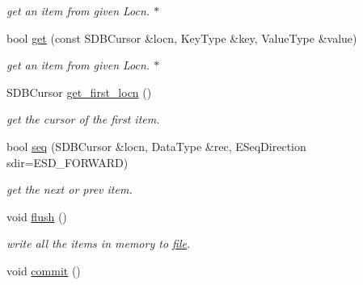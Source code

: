 \begin{CompactItemize}
\begin{CompactList}\small\item\em get an item from given Locn. $\ast$ \item\end{CompactList}\item 
\hypertarget{classsdb__btree_4e4408d7daafd2fcf1a1baeff8101765}{
bool \hyperlink{classsdb__btree_4e4408d7daafd2fcf1a1baeff8101765}{get} (const SDBCursor \&locn, KeyType \&key, ValueType \&value)}
\label{classsdb__btree_4e4408d7daafd2fcf1a1baeff8101765}

\begin{CompactList}\small\item\em get an item from given Locn. $\ast$ \item\end{CompactList}\item 
\hypertarget{classsdb__btree_0388b79df1693137217f884588e2e30d}{
SDBCursor \hyperlink{classsdb__btree_0388b79df1693137217f884588e2e30d}{get\_\-first\_\-locn} ()}
\label{classsdb__btree_0388b79df1693137217f884588e2e30d}

\begin{CompactList}\small\item\em get the cursor of the first item. \item\end{CompactList}\item 
bool \hyperlink{classsdb__btree_dfcd196457bcb4517403a6471a7076af}{seq} (SDBCursor \&locn, DataType \&rec, ESeqDirection sdir=ESD\_\-FORWARD)
\begin{CompactList}\small\item\em get the next or prev item. \item\end{CompactList}\item 
\hypertarget{classsdb__btree_1e6e4ead81ba7d871919a601fd68c1e6}{
void \hyperlink{classsdb__btree_1e6e4ead81ba7d871919a601fd68c1e6}{flush} ()}
\label{classsdb__btree_1e6e4ead81ba7d871919a601fd68c1e6}

\begin{CompactList}\small\item\em write all the items in memory to \hyperlink{classfile}{file}. \item\end{CompactList}\item 
\hypertarget{classsdb__btree_4336e972867ad749ce98519fe5220bc5}{
void \hyperlink{classsdb__btree_4336e972867ad749ce98519fe5220bc5}{commit} ()}
\label{classsdb__btree_4336e972867ad749ce98519fe5220bc5}


\end{CompactItemize}
